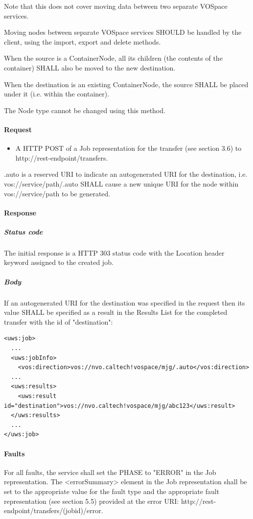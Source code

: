 \documentclass[11pt,a4paper]{ivoa}
\begin{document}
Note that this does not cover moving data between two separate VOSpace services.

Moving nodes between separate VOSpace services SHOULD be handled by the client, using the import, export and delete methods.

When the source is a ContainerNode, all its children (the contents of the container) SHALL also be moved to the new destination.

When the destination is an existing ContainerNode, the source SHALL be placed under it (i.e. within the container).

The Node type cannot be changed using this method.

\paragraph{Request}
\begin{itemize}
    \item A HTTP POST of a Job representation for the transfer (see section 3.6) to http://rest-endpoint/transfers.
\end{itemize}

.auto is a reserved URI to indicate an autogenerated URI for the destination, i.e. vos://service/path/.auto SHALL cause a new unique URI for the node within vos://service/path to be generated.

\paragraph{Response}
\subparagraph{Status code} The initial response is a HTTP 303 status code with the Location header keyword assigned to the created job.
\subparagraph{Body}
If an autogenerated URI for the destination was specified in the request then its value SHALL be specified as a result in the Results List for the completed transfer with the id of "destination":
\begin{lstlisting}
<uws:job>
  ...
  <uws:jobInfo>
    <vos:direction>vos://nvo.caltech!vospace/mjg/.auto</vos:direction>
  ...
  <uws:results>
    <uws:result id="destination">vos://nvo.caltech!vospace/mjg/abc123</uws:result>
  </uws:results>
  ...
</uws:job>
\end{lstlisting}

\paragraph{Faults}

For all faults, the service shall set the PHASE to "ERROR" in the Job representation. The <errorSummary> element in the Job representation shall be set to the appropriate value for the fault type and the appropriate fault representation (see section 5.5) provided at the error URI: http://rest-endpoint/transfers/(jobid)/error.
\end{document}
